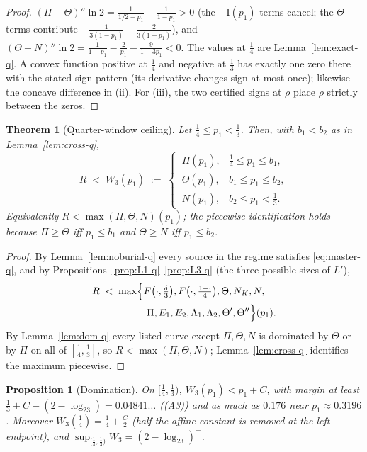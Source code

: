 \documentclass[journal]{IEEEtran}
\newtheorem{theorem}{Theorem}
\newtheorem{proposition}{Proposition}
\theoremstyle{definition}
\newcommand{\lgg}{\log_2}
\newcommand{\CC}{C}
\begin{document}
\begin{proof}
$(\Pi-\Theta)''\ln2=\tfrac1{1/2-p_1}-\tfrac1{1-p_1}>0$ \textup{(}the
$-\mathrm I(p_1)$ terms cancel; the $\Theta$-terms contribute
$-\tfrac1{3(1-p_1)}-\tfrac2{3(1-p_1)}$\textup{)}, and
$(\Theta-N)''\ln2=\tfrac1{1-p_1}-\tfrac2{p_1}-\tfrac9{1-3p_1}<0$. The
values at $\tfrac14$ are Lemma~\ref{lem:exact-q}. A convex function
positive at $\tfrac14$ and negative at $\tfrac13$ has exactly one zero
there with the stated sign pattern (its derivative changes sign at most
once); likewise the concave difference in (ii). For (iii), the two
certified signs at $\rho$ place $\rho$ strictly between the zeros.
\end{proof}

\begin{theorem}[Quarter-window ceiling]\label{thm:quarter}
Let $\tfrac14\le p_1<\tfrac13$. Then, with $b_1<b_2$ as in
Lemma~\textup{\ref{lem:cross-q}},
\[
  R\;<\;W_3(p_1)\;:=\;
  \begin{cases}
    \ \Pi(p_1), & \tfrac14\le p_1\le b_1,\\[3pt]
    \ \Theta(p_1), & b_1\le p_1\le b_2,\\[3pt]
    \ N(p_1), & b_2\le p_1<\tfrac13 .
  \end{cases}
\]
Equivalently $R<\max(\Pi,\Theta,N)(p_1)$; the piecewise identification
holds because $\Pi\ge\Theta$ iff $p_1\le b_1$ and $\Theta\ge N$ iff
$p_1\le b_2$.
\end{theorem}

\begin{proof}
By Lemma~\ref{lem:noburial-q} every source in the regime satisfies
\eqref{eq:master-q}, and by
Propositions~\ref{prop:L1-q}--\ref{prop:L3-q} (the three possible sizes
of $L'$),
\[
\begin{aligned}
  R\;<\;\max\Bigl\{&F\bigl(\cdot,\tfrac\delta3\bigr),
  F\bigl(\cdot,\tfrac{1-\cdot}4\bigr),\Theta,N_K,N,\\
  &\ \Pi,E_1,E_2,\Lambda_1,\Lambda_2,\Theta',\Theta''\Bigr\}(p_1).
\end{aligned}
\]
By Lemma~\ref{lem:dom-q} every listed curve except $\Pi,\Theta,N$ is
dominated by $\Theta$ or by $\Pi$ on all of $[\tfrac14,\tfrac13]$, so
$R<\max(\Pi,\Theta,N)$; Lemma~\ref{lem:cross-q} identifies the maximum
piecewise.
\end{proof}

\begin{proposition}[Domination]\label{prop:dom-q}
On $[\tfrac14,\tfrac13)$, $W_3(p_1)<p_1+\CC$, with margin at least
$\tfrac13+\CC-(2-\lgg3)=0.04841\ldots$ \textup{(}\textup{(A3)}\textup{)}
and as much as $0.176$ near $p_1\approx0.3196$. Moreover
$W_3(\tfrac14)=\tfrac14+\tfrac{\CC}2$ \textup{(}half the affine constant
is removed at the left endpoint\textup{)}, and
$\sup_{[\frac14,\frac13)}W_3=(2-\lgg3)^-$.
\end{proposition}
\end{document}
